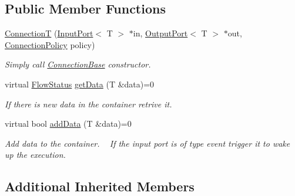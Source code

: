 \subsection*{Public Member Functions}
\begin{DoxyCompactItemize}
\item 
\hypertarget{classcoco_1_1_connection_t_a036f8c67d029ce417a331df695d49515}{}\hyperlink{classcoco_1_1_connection_t_a036f8c67d029ce417a331df695d49515}{Connection\+T} (\hyperlink{classcoco_1_1_input_port}{Input\+Port}$<$ T $>$ $\ast$in, \hyperlink{classcoco_1_1_output_port}{Output\+Port}$<$ T $>$ $\ast$out, \hyperlink{structcoco_1_1_connection_policy}{Connection\+Policy} policy)\label{classcoco_1_1_connection_t_a036f8c67d029ce417a331df695d49515}

\begin{DoxyCompactList}\small\item\em Simply call \hyperlink{classcoco_1_1_connection_base}{Connection\+Base} constructor. \end{DoxyCompactList}\item 
\hypertarget{classcoco_1_1_connection_t_aed88cfa8b0384f879b09561096b35a56}{}virtual \hyperlink{namespacecoco_a057be58377e415c9be98c1dc5c8426ad}{Flow\+Status} \hyperlink{classcoco_1_1_connection_t_aed88cfa8b0384f879b09561096b35a56}{get\+Data} (T \&data)=0\label{classcoco_1_1_connection_t_aed88cfa8b0384f879b09561096b35a56}

\begin{DoxyCompactList}\small\item\em If there is new data in the container retrive it. \end{DoxyCompactList}\item 
\hypertarget{classcoco_1_1_connection_t_addca57488f686446a10e0f37bfa8c1ea}{}virtual bool \hyperlink{classcoco_1_1_connection_t_addca57488f686446a10e0f37bfa8c1ea}{add\+Data} (T \&data)=0\label{classcoco_1_1_connection_t_addca57488f686446a10e0f37bfa8c1ea}

\begin{DoxyCompactList}\small\item\em Add data to the container. ~\newline
 If the input port is of type event trigger it to wake up the execution. \end{DoxyCompactList}\end{DoxyCompactItemize}
\subsection*{Additional Inherited Members}


